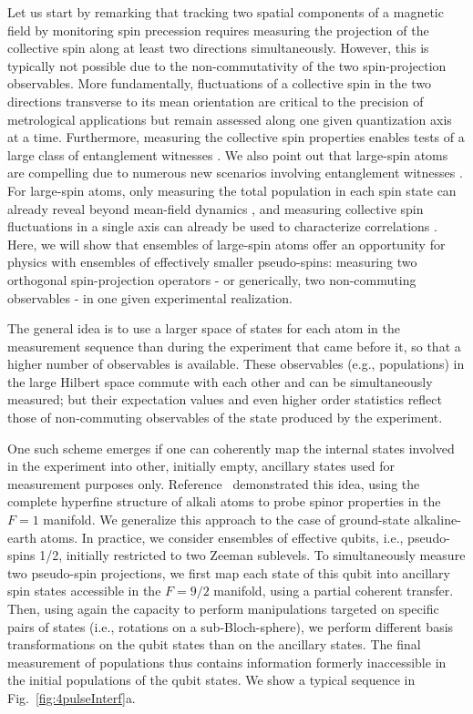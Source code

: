 Let us start by remarking that tracking two spatial components of a magnetic field by monitoring spin precession requires measuring the projection of the collective spin along at least two directions simultaneously. However, this is typically not possible due to the non-commutativity of the two spin-projection observables. More fundamentally, fluctuations of a collective spin in the two directions transverse to its mean orientation are critical to the precision of metrological applications \cite{Kitagawa1993sss, Yurke1986sas} but remain assessed along one given quantization axis at a time. Furthermore, measuring the collective spin properties enables tests of a large class of entanglement witnesses \cite{Esteve2008sae, Lewenstein2000ooe, Lucke2014dme, Hosten2016mn1}. We also point out that large-spin atoms are compelling due to numerous new scenarios involving entanglement witnesses \cite{Sorensen2001eae, Vitagliano2011ssi}. For large-spin atoms, only measuring the total population in each spin state can already reveal beyond mean-field dynamics \cite{Klempt2010pao, Lepoutre2019ooe}, and measuring collective spin fluctuations in a single axis can already be used to characterize correlations \cite{Alaoui2022mcf, alaoui2024}. Here, we will show that ensembles of large-spin atoms offer an opportunity for physics with ensembles of effectively smaller pseudo-spins: measuring two orthogonal spin-projection operators - or generically, two non-commuting observables - in one given experimental realization. 


The general idea is to use a larger space of states for each atom in the measurement sequence than during the experiment that came before it, so that a higher number of observables is available. These observables (e.g., populations) in the large Hilbert space commute with each other and can be simultaneously measured; but their expectation values and even higher order statistics reflect those of non-commuting observables of the state produced by the experiment.

One such scheme emerges if one can coherently map the internal states involved in the experiment into other, initially empty, ancillary states used for measurement purposes only. Reference~\cite{Kunkel2019} demonstrated this idea, using the complete hyperfine structure of alkali atoms to probe spinor properties in the $F=1$ manifold. We generalize this approach to the case of ground-state alkaline-earth atoms. In practice, we consider ensembles of effective qubits, i.e., pseudo-spins 1/2, initially restricted to two Zeeman sublevels. To simultaneously measure two pseudo-spin projections, we first map each state of this qubit into ancillary spin states accessible in the $F=9/2$ manifold, using a partial coherent transfer. Then, using again the capacity to perform manipulations targeted on specific pairs of states (i.e., rotations on a sub-Bloch-sphere), we perform different basis transformations on the qubit states than on the ancillary states. The final measurement of populations thus contains information formerly inaccessible in the initial populations of the qubit states.  We show a typical sequence in Fig.~\ref{fig:4pulseInterf}a. 

